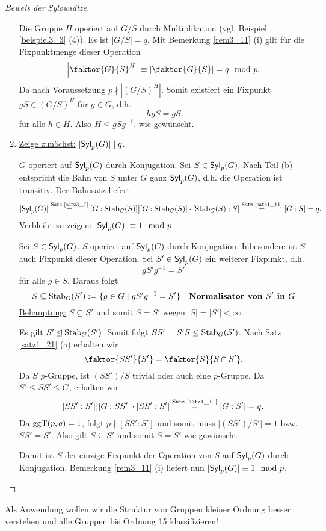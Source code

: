 \begin{proof}[Beweis der Sylowsätze]
\begin{enumerate}[label=(\alph*)]
		Die Gruppe $H$ operiert auf $G/S$ durch Multiplikation (vgl. Beispiel \ref{beispiel3_3} (4)). Es ist $|G/S| = q$. Mit Bemerkung \ref{rem3_11} (i) gilt für die Fixpunktmenge dieser Operation
		\[\left|{\faktor{G}{S}}^H\right| \equiv \left|\faktor{G}{S}\right| = q \mod p.\]
		Da nach Voraussetzung $p \nmid |(G/S)^H|$. Somit existiert ein Fixpunkt $gS \in (G/S)^H$ für $g \in G$, d.h. 
		\[hgS = gS\]
		für alle $h \in H$. Also $H \leq gSg^{-1}$, wie gewünscht.
		
		\item \underline{Zeige zunächst:} $|\mathsf{Syl}_p(G)| \mid q$.
		
		$G$ operiert auf $\mathsf{Syl}_p(G)$ durch Konjugation. Sei $S \in \mathsf{Syl}_p(G)$. Nach Teil (b) entspricht die Bahn von $S$ unter $G$ ganz $\mathsf{Syl}_p(G)$, d.h. die Operation ist transitiv. Der Bahnsatz liefert
		\[|\mathsf{Syl}_p(G)| \overset{\text{Satz \ref{satz3_7}}}{=} [G:\mathrm{Stab}_G(S)] \big| [G:\mathrm{Stab}_G(S)] \cdot [\mathrm{Stab}_G(S) : S] \overset{\text{Satz \ref{satz1_11}}}{=} [G:S] = q.\]
		\underline{Verbleibt zu zeigen:} $|\mathsf{Syl}_p(G)| \equiv 1 \mod p$.

		Sei $S \in \mathsf{Syl}_p(G)$. $S$ operiert auf $\mathsf{Syl}_p(G)$ durch Konjugation. Inbesondere ist $S$ auch Fixpunkt dieser Operation. Sei $S' \in \mathsf{Syl}_p(G)$ ein weiterer Fixpunkt, d.h. 
		\[gS'g^{-1} = S'\]
		für alle $g \in S$. Daraus folgt
		\[S \subseteq \mathrm{Stab}_G(S') := \{g \in G\mid gS'g^{-1} = S'\} \quad \textbf{Normalisator von $S'$ in $G$}\]
		\underline{Behauptung:} $S \subseteq S'$ und somit $S = S'$ wegen $|S| = |S'| < \infty$.
		
		Es gilt $S' \unlhd \mathrm{Stab}_G(S')$. Somit folgt $SS' = S'S \leq \mathrm{Stab}_G(S')$. Nach Satz \ref{satz1_21} (a) erhalten wir 
		\[\faktor{SS'}{S'} = \faktor{S}{S \cap S'}.\]
		Da $S$ $p$-Gruppe, ist $(SS')/S$ trivial oder auch eine $p$-Gruppe. Da $S' \leq SS' \leq G$, erhalten wir
		\[[SS' : S'] \big| [G : SS'] \cdot [SS' : S'] \overset{\text{Satz \ref{satz1_11}}}{=} [G:S'] = q.\]
		Da $\mathrm{ggT}(p,q) = 1$, folgt $p \nmid [SS' : S']$ und somit muss $|(SS')/S'| = 1$ bzw. $SS' = S'$. Also gilt $S \subseteq S'$ und somit $S = S'$ wie gewünscht.
		
		Damit ist $S$ der einzige Fixpunkt der Operation von $S$ auf $\mathsf{Syl}_p(G)$ durch Konjugation. Bemerkung \ref{rem3_11} (i) liefert nun $|\mathsf{Syl}_p(G)| \equiv 1 \mod p$.
	\end{enumerate}
\end{proof}

Als Anwendung wollen wir die Struktur von Gruppen kleiner Ordnung besser verstehen und alle Gruppen bis Ordnung 15 klassifizieren!

